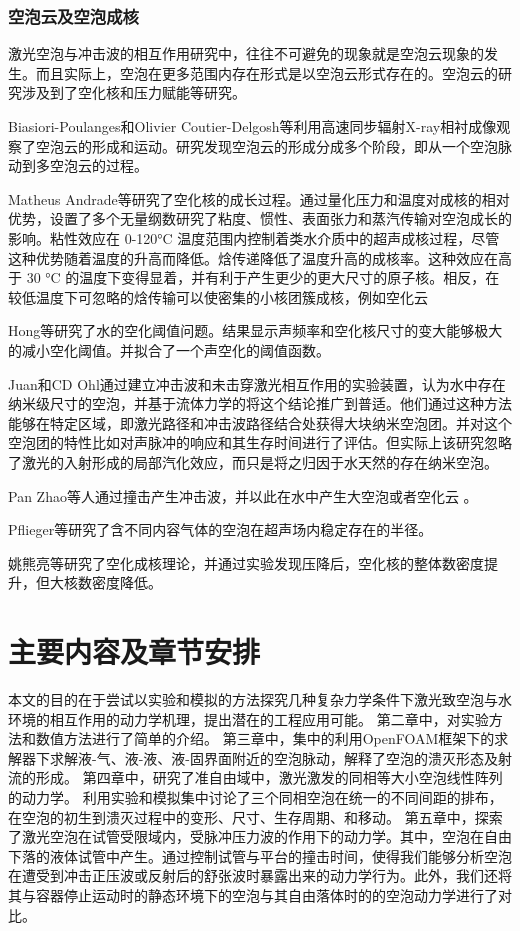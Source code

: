 \subsubsection{空泡云及空泡成核}

激光空泡与冲击波的相互作用研究中，往往不可避免的现象就是空泡云现象的发生。而且实际上，空泡在更多范围内存在形式是以空泡云形式存在的。空泡云的研究涉及到了空化核和压力赋能等研究。

Biasiori-Poulanges和Olivier Coutier-Delgosh等利用高速同步辐射X-ray相衬成像观察了空泡云的形成和运动\cite{biasiori-poulanges_synchrotron_2023,zhang_experimental_2020}。研究发现空泡云的形成分成多个阶段，即从一个空泡脉动到多空泡云的过程。

Matheus Andrade等研究了空化核的成长过程\cite{DEANDRADE2022106091}。通过量化压力和温度对成核的相对优势，设置了多个无量纲数研究了粘度、惯性、表面张力和蒸汽传输对空泡成长的影响。粘性效应在 0-120°C 温度范围内控制着类水介质中的超声成核过程，尽管这种优势随着温度的升高而降低。焓传递降低了温度升高的成核率。这种效应在高于 30 °C 的温度下变得显着，并有利于产生更少的更大尺寸的原子核。相反，在较低温度下可忽略的焓传输可以使密集的小核团簇成核，例如空化云

Hong等研究了水的空化阈值问题\cite{hong_numerical_2022}。结果显示声频率和空化核尺寸的变大能够极大的减小空化阈值。并拟合了一个声空化的阈值函数。

Juan和CD Ohl通过建立冲击波和未击穿激光相互作用的实验装置，认为水中存在纳米级尺寸的空泡，并基于流体力学的将这个结论推广到普适\cite{rossello_-demand_2021}。他们通过这种方法能够在特定区域，即激光路径和冲击波路径结合处获得大块纳米空泡团。并对这个空泡团的特性比如对声脉冲的响应和其生存时间进行了评估。但实际上该研究忽略了激光的入射形成的局部汽化效应，而只是将之归因于水天然的存在纳米空泡。

Pan Zhao等人通过撞击产生冲击波，并以此在水中产生大空泡或者空化云 \cite{speirs_cavitation_2021,xu_criteria_2021,pan_cavitation_2017}。

Pflieger等研究了含不同内容气体的空泡在超声场内稳定存在的半径\cite{pflieger_impact_2021}。

姚熊亮等研究了空化成核理论，并通过实验发现压降后，空化核的整体数密度提升，但大核数密度降低\cite{yao_study_2020}。



\section{主要内容及章节安排}
本文的目的在于尝试以实验和模拟的方法探究几种复杂力学条件下激光致空泡与水环境的相互作用的动力学机理，提出潜在的工程应用可能。
第二章中，对实验方法和数值方法进行了简单的介绍。
第三章中，集中的利用OpenFOAM框架下的求解器下求解液-气、液-液、液-固界面附近的空泡脉动，解释了空泡的溃灭形态及射流的形成。
第四章中，研究了准自由域中，激光激发的同相等大小空泡线性阵列的动力学。 利用实验和模拟集中讨论了三个同相空泡在统一的不同间距的排布，在空泡的初生到溃灭过程中的变形、尺寸、生存周期、和移动。
第五章中，探索了激光空泡在试管受限域内，受脉冲压力波的作用下的动力学。其中，空泡在自由下落的液体试管中产生。通过控制试管与平台的撞击时间，使得我们能够分析空泡在遭受到冲击正压波或反射后的舒张波时暴露出来的动力学行为。此外，我们还将其与容器停止运动时的静态环境下的空泡与其自由落体时的的空泡动力学进行了对比。



